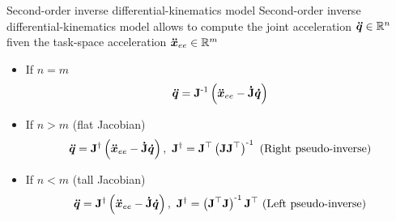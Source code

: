 \begin{frame}{Second-order inverse differential-kinematics model}
	Second-order inverse differential-kinematics model allows to compute the joint acceleration $\bm{\ddot{q}}\in\mathbb{R}^n $ fiven the task-space acceleration $\bm{\ddot{x}}_{ee}\in\mathbb{R}^m$ 
	\begin{itemize}
		\item If $n=m$
		\begin{equation*}
			\bm{\ddot{q}}=\mathbf{J}^{\text{-}1}\left(\bm{\ddot{x}}_{ee}-\mathbf{\dot{J}}\bm{\dot{q}}\right)
		\end{equation*}
		\item If $n>m$ (flat Jacobian)
		\begin{equation*}
			\vectorQddot=\matriceJ^\dagger\left(\vectorXddot_{ee}-\matriceJdot\vectorQdot\right), \ \matriceJ^\dagger=\matriceJ^\top\left(\matriceJ\matriceJ^\top\right)\inv~\text{(Right pseudo-inverse)}
		\end{equation*}
		\item If $n<m$ (tall Jacobian)
		\begin{equation*}
			\vectorQddot=\matriceJ^\dagger\left(\vectorXddot_{ee}-\matriceJdot\vectorQdot\right), \ \matriceJ^\dagger=\left(\matriceJ^\top\matriceJ\right)\inv\matriceJ^\top~\text{(Left pseudo-inverse)}
		\end{equation*}
	\end{itemize}
\end{frame}